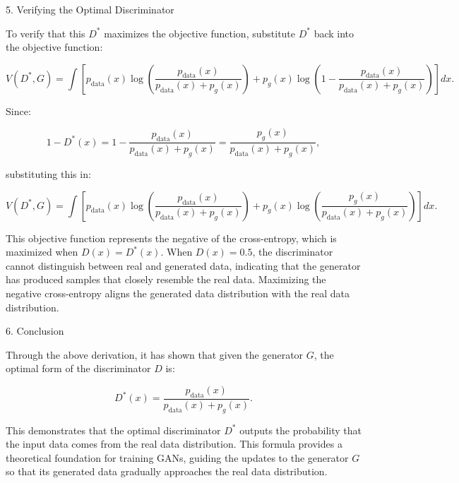 5. Verifying the Optimal Discriminator

To verify that this \( D^* \) maximizes the objective function, substitute \( D^* \) back into the objective function:

\begin{equation}
    V(D^*, G) = \int \left[ p_{\text{data}}(x) \log \left( \frac{p_{\text{data}}(x)}{p_{\text{data}}(x) + p_g(x)} \right) + p_g(x) \log \left( 1 - \frac{p_{\text{data}}(x)}{p_{\text{data}}(x) + p_g(x)} \right) \right] dx.
\end{equation}

Since:

\begin{equation}
    1 - D^*(x) = 1 - \frac{p_{\text{data}}(x)}{p_{\text{data}}(x) + p_g(x)} = \frac{p_g(x)}{p_{\text{data}}(x) + p_g(x)},
\end{equation}

substituting this in:

\begin{equation}
    V(D^*, G) = \int \left[ p_{\text{data}}(x) \log \left( \frac{p_{\text{data}}(x)}{p_{\text{data}}(x) + p_g(x)} \right) + p_g(x) \log \left( \frac{p_g(x)}{p_{\text{data}}(x) + p_g(x)} \right) \right] dx.
\end{equation}

This objective function represents the negative of the cross-entropy, which is maximized when $D(x) = D^*(x)$. When $D(x) = 0.5$, the discriminator cannot distinguish between real and generated data, indicating that the generator has produced samples that closely resemble the real data. Maximizing the negative cross-entropy aligns the generated data distribution with the real data distribution.

6. Conclusion

Through the above derivation, it has shown that given the generator \( G \), the optimal form of the discriminator \( D \) is:

\begin{equation}
    D^*(x) = \frac{p_{\text{data}}(x)}{p_{\text{data}}(x) + p_g(x)}.
\end{equation}

This demonstrates that the optimal discriminator \( D^* \) outputs the probability that the input data comes from the 
real data distribution. 
This formula provides a theoretical foundation for training GANs, guiding the updates to the generator \( G \) so that 
its generated data gradually approaches the real data distribution.


